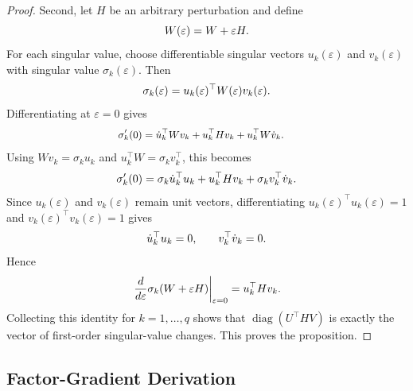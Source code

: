 \documentclass[11pt, a4paper]{utda}
\theoremstyle{plain}
\theoremstyle{definition}
\theoremstyle{remark}
\begin{document}
\begin{proof}
Second, let $H$ be an arbitrary perturbation and define
\begin{equation}
\small
    W(\varepsilon)=W+\varepsilon H .
\end{equation}
For each singular value, choose differentiable singular vectors
$u_k(\varepsilon)$ and $v_k(\varepsilon)$ with singular value
$\sigma_k(\varepsilon)$. Then
\begin{equation}
\small
    \sigma_k(\varepsilon)
    =
    u_k(\varepsilon)^\top
    W(\varepsilon)
    v_k(\varepsilon).
\end{equation}
Differentiating at $\varepsilon=0$ gives
\begin{equation}
\small
\begin{aligned}
    \sigma_k'(0)
    &=
    \dot u_k^\top W v_k
    +
    u_k^\top H v_k
    +
    u_k^\top W \dot v_k .
\end{aligned}
\end{equation}
Using $Wv_k=\sigma_k u_k$ and $u_k^\top W=\sigma_k v_k^\top$, this becomes
\begin{equation}
\small
    \sigma_k'(0)
    =
    \sigma_k \dot u_k^\top u_k
    +
    u_k^\top H v_k
    +
    \sigma_k v_k^\top \dot v_k .
\end{equation}
Since $u_k(\varepsilon)$ and $v_k(\varepsilon)$ remain unit vectors,
differentiating
$u_k(\varepsilon)^\top u_k(\varepsilon)=1$ and
$v_k(\varepsilon)^\top v_k(\varepsilon)=1$ gives
\begin{equation}
\small
    \dot u_k^\top u_k=0,
    \qquad
    v_k^\top \dot v_k=0 .
\end{equation}
Hence
\begin{equation}
\small
    \left.
    \frac{d}{d\varepsilon}
    \sigma_k(W+\varepsilon H)
    \right|_{\varepsilon=0}
    =
    u_k^\top H v_k .
\end{equation}
Collecting this identity for $k=1,\ldots,q$ shows that
$\operatorname{diag}(U^\top H V)$ is exactly the vector of first-order
singular-value changes. This proves the proposition.
\end{proof}

\subsection{Factor-Gradient Derivation}
\label{app:iso_factor_gradients}
\end{document}
